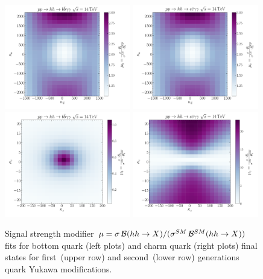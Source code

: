 \begin{figure}[!t]
	\centering
	\includegraphics[width = 0.49\textwidth]{./fig/mub_fit_kdku.pdf}
	\includegraphics[width = 0.49\textwidth]{./fig/muc_fit_kdku}
	\\
	\includegraphics[width = 0.49\textwidth]{./fig/mub_fit_kskc}
	\includegraphics[width = 0.49\textwidth]{./fig/muc_fit_kskc}
	\caption{Signal strength modifier $\mu = \sigma \,{\cal B}(hh \to X) / (\sigma^{SM} \,{\cal B}^{SM}(hh \to X) )$  fits for bottom quark (left plots) and charm quark (right plots)  final states for  first~(upper row) and second~(lower row) generations quark Yukawa modifications.}
	\label{kcks_mu_contors}
\end{figure}
